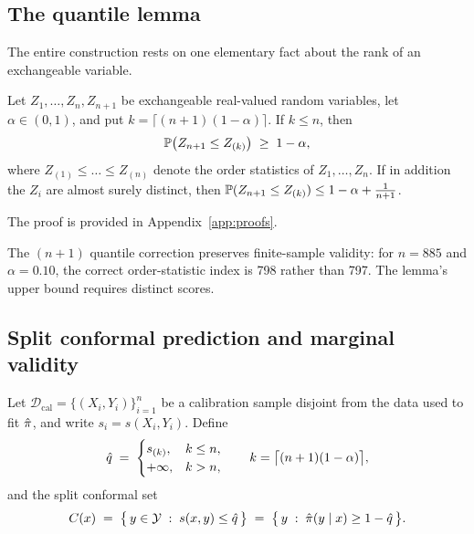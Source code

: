 \subsection{The quantile lemma}

The entire construction rests on one elementary fact about the rank of an
exchangeable variable.

\begin{lemma}\label{lem:quantile}
Let $Z_1, \dots, Z_n, Z_{n+1}$ be exchangeable real-valued random variables,
let $\alpha \in (0,1)$, and put $k = \lceil (n+1)(1-\alpha) \rceil$. If
$k \le n$, then
\begin{equation}
\mathbb{P}\big( Z_{n+1} \le Z_{(k)} \big) \;\ge\; 1-\alpha ,
\end{equation}
where $Z_{(1)} \le \dots \le Z_{(n)}$ denote the order statistics of
$Z_1,\dots,Z_n$. If in addition the $Z_i$ are almost surely distinct, then
$\mathbb{P}( Z_{n+1} \le Z_{(k)} ) \le 1-\alpha + \tfrac{1}{n+1}$.
\end{lemma}

\noindent The proof is provided in Appendix~\ref{app:proofs}.

\begin{remark}
The $(n+1)$ quantile correction preserves finite-sample validity:
for $n=885$ and $\alpha=0.10$, the correct order-statistic index is
798 rather than 797. The lemma's upper bound requires distinct scores.
\end{remark}

\subsection{Split conformal prediction and marginal validity}

Let $\mathcal{D}_{\mathrm{cal}} = \{(X_i, Y_i)\}_{i=1}^{n}$ be a calibration
sample disjoint from the data used to fit $\hat{\pi}$, and write
$s_i = s(X_i, Y_i)$. Define
\begin{equation}
\hat{q} \;=\; \begin{cases}s_{(k)},&k\le n,\\+\infty,&k>n,\end{cases}\qquad k=\big\lceil(n+1)(1-\alpha)\big\rceil,
\label{eq:qhat}
\end{equation}
and the split conformal set
\begin{equation}
C(x) \;=\; \big\{\, y \in \mathcal{Y} \;:\; s(x,y) \le \hat{q} \,\big\}
\;=\; \big\{\, y \;:\; \hat{\pi}(y \mid x) \ge 1 - \hat{q} \,\big\} .
\label{eq:cset}
\end{equation}

